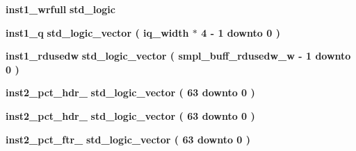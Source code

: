 \begin{DoxyCompactItemize}
\item 
{\bf inst1\+\_\+wrfull} {\bfseries \textcolor{comment}{std\+\_\+logic}\textcolor{vhdlchar}{ }} 
\item 
{\bf inst1\+\_\+q} {\bfseries \textcolor{comment}{std\+\_\+logic\+\_\+vector}\textcolor{vhdlchar}{ }\textcolor{vhdlchar}{(}\textcolor{vhdlchar}{ }\textcolor{vhdlchar}{ }\textcolor{vhdlchar}{ }\textcolor{vhdlchar}{ }{\bfseries {\bf iq\+\_\+width}} \textcolor{vhdlchar}{$\ast$}\textcolor{vhdlchar}{ } \textcolor{vhdldigit}{4} \textcolor{vhdlchar}{-\/}\textcolor{vhdlchar}{ } \textcolor{vhdldigit}{1} \textcolor{vhdlchar}{ }\textcolor{keywordflow}{downto}\textcolor{vhdlchar}{ }\textcolor{vhdlchar}{ } \textcolor{vhdldigit}{0} \textcolor{vhdlchar}{ }\textcolor{vhdlchar}{)}\textcolor{vhdlchar}{ }} 
\item 
{\bf inst1\+\_\+rdusedw} {\bfseries \textcolor{comment}{std\+\_\+logic\+\_\+vector}\textcolor{vhdlchar}{ }\textcolor{vhdlchar}{(}\textcolor{vhdlchar}{ }\textcolor{vhdlchar}{ }\textcolor{vhdlchar}{ }\textcolor{vhdlchar}{ }{\bfseries {\bf smpl\+\_\+buff\+\_\+rdusedw\+\_\+w}} \textcolor{vhdlchar}{-\/}\textcolor{vhdlchar}{ } \textcolor{vhdldigit}{1} \textcolor{vhdlchar}{ }\textcolor{keywordflow}{downto}\textcolor{vhdlchar}{ }\textcolor{vhdlchar}{ } \textcolor{vhdldigit}{0} \textcolor{vhdlchar}{ }\textcolor{vhdlchar}{)}\textcolor{vhdlchar}{ }} 
\item 
{\bf inst2\+\_\+pct\+\_\+hdr\+\_} {\bfseries \textcolor{comment}{std\+\_\+logic\+\_\+vector}\textcolor{vhdlchar}{ }\textcolor{vhdlchar}{(}\textcolor{vhdlchar}{ }\textcolor{vhdlchar}{ } \textcolor{vhdldigit}{63} \textcolor{vhdlchar}{ }\textcolor{keywordflow}{downto}\textcolor{vhdlchar}{ }\textcolor{vhdlchar}{ } \textcolor{vhdldigit}{0} \textcolor{vhdlchar}{ }\textcolor{vhdlchar}{)}\textcolor{vhdlchar}{ }} 
\item 
{\bf inst2\+\_\+pct\+\_\+hdr\+\_} {\bfseries \textcolor{comment}{std\+\_\+logic\+\_\+vector}\textcolor{vhdlchar}{ }\textcolor{vhdlchar}{(}\textcolor{vhdlchar}{ }\textcolor{vhdlchar}{ } \textcolor{vhdldigit}{63} \textcolor{vhdlchar}{ }\textcolor{keywordflow}{downto}\textcolor{vhdlchar}{ }\textcolor{vhdlchar}{ } \textcolor{vhdldigit}{0} \textcolor{vhdlchar}{ }\textcolor{vhdlchar}{)}\textcolor{vhdlchar}{ }} 
\item 
{\bf inst2\+\_\+pct\+\_\+ftr\+\_} {\bfseries \textcolor{comment}{std\+\_\+logic\+\_\+vector}\textcolor{vhdlchar}{ }\textcolor{vhdlchar}{(}\textcolor{vhdlchar}{ }\textcolor{vhdlchar}{ } \textcolor{vhdldigit}{63} \textcolor{vhdlchar}{ }\textcolor{keywordflow}{downto}\textcolor{vhdlchar}{ }\textcolor{vhdlchar}{ } \textcolor{vhdldigit}{0} \textcolor{vhdlchar}{ }\textcolor{vhdlchar}{)}\textcolor{vhdlchar}{ }} 

\end{DoxyCompactItemize}
